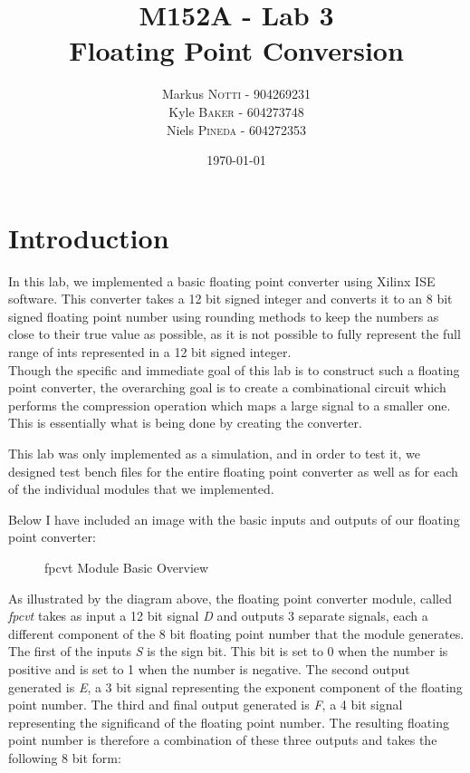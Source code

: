 \documentclass{article}
\title{M152A - Lab 3 \\ Floating Point Conversion} %
\author{Markus \textsc{Notti} - 904269231 \\ Kyle \textsc{Baker}  - 604273748 \\ Niels \textsc{Pineda} - 604272353} %
\date{\today} %
\begin{document}
\maketitle %


\section*{Introduction}


In this lab, we implemented a basic floating point converter using Xilinx ISE software.  This converter takes a 12 bit signed integer and converts it to an 8 bit signed floating point number using rounding methods to keep the numbers as close to their true value as possible, as it is not possible to fully represent the full range of ints represented in a 12 bit signed integer. \\

Though the specific and immediate goal of this lab is to construct such a floating point converter, the overarching goal is to create a combinational circuit which performs the compression operation which maps a large signal to a smaller one.  This is essentially what is being done by creating the converter.

This lab was only implemented as a simulation, and in order to test it, we designed test bench files for the entire floating point converter as well as for each of the individual modules that we implemented.

Below I have included an image with the basic inputs and outputs of our floating point converter:

\begin{figure}[H]
\begin{center}
\caption{fpcvt Module Basic Overview}
\end{center}
\end{figure}

As illustrated by the diagram above, the floating point converter module, called \textit{fpcvt} takes as input a 12 bit signal \textit{D} and outputs 3 separate signals, each a different component of the 8 bit floating point number that the module generates.  The first of the inputs \textit{S} is the sign bit. This bit is set to 0 when the number is positive and is set to 1 when the number is negative.  The second output generated is \textit{E}, a 3 bit signal representing the exponent component of the floating point number.  The third and final output generated is \textit{F}, a 4 bit signal representing the significand of the floating point number.  The resulting floating point number is therefore a combination of these three outputs and takes the following 8 bit form:
\end{document}

